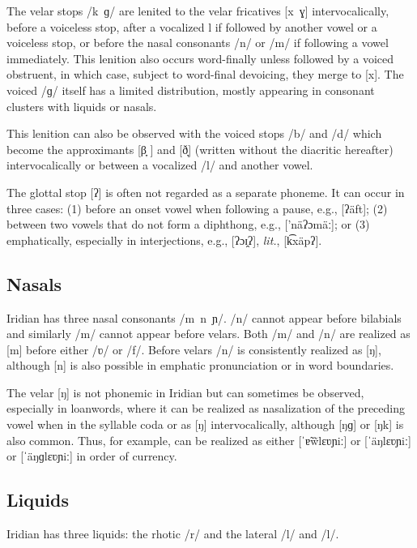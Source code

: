 The velar stops /k~ɡ/ are lenited to the velar fricatives [x~ɣ] intervocalically, before a voiceless stop, after a vocalized l if followed by another vowel or a voiceless stop, or before the nasal consonants /n/ or /m/ if following a vowel immediately. This lenition also occurs word-finally unless followed by a voiced obstruent, in which case, subject to word-final devoicing, they merge to [x]. The voiced /ɡ/ itself has a limited distribution, mostly appearing in consonant clusters with liquids or nasals.

This lenition can also be observed with the voiced stops /b/ and /d/ which become the approximants [β̞	] and [ð̞] (written without the diacritic hereafter) intervocalically or between a vocalized /l/ and another vowel.

The glottal stop [ʔ] is often not regarded as a separate phoneme.
It can occur in three cases: (1) before an onset vowel when following a pause, e.g.,  [ʔäft]; (2) between two vowels that do not form a diphthong, e.g.,  ['näʔɔmäː]; or (3) emphatically, especially in interjections, e.g.,  [ʔɔɪ̯ʔ],  \emph{lit.},  [k͡xäpʔ].


\subsection{Nasals}
Iridian has three nasal consonants /m~n~ɲ/. /n/ cannot appear before bilabials and similarly /m/ cannot appear before velars. Both /m/ and /n/ are realized as [m] before either /ʋ/ or /f/. Before velars /n/ is consistently realized as [ŋ], although [n] is also possible in emphatic pronunciation or in word boundaries.

The velar [ŋ] is not phonemic in Iridian but can sometimes be observed, especially in loanwords, where it can be realized as nasalization of the preceding vowel when in the syllable coda or as [ŋ] intervocalically, although [ŋɡ] or [ŋk] is also common. Thus, for example,  can be realized as either [ˈɐ̃w̃lɛʋɲiː] or [ˈäŋlɛʋɲiː] or [ˈäŋɡlɛʋɲiː] in order of currency.


\subsection{Liquids}

Iridian has three liquids: the rhotic /r/ and the lateral /l/ and /l/.

